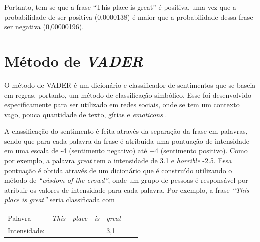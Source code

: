 Portanto, tem-se que a frase ``This place is great'' é positiva, uma vez que a
probabilidade de ser positiva (0,0000138) é maior que a probabilidade dessa
frase ser negativa (0,00000196).

\section{Método de \textit{VADER}}

O método de \ac{VADER} é um dicionário e classificador de sentimentos que se
baseia em regras, portanto, um método de classificação simbólico. Esse foi desenvolvido
especificamente para ser utilizado em redes sociais, onde se tem um contexto
vago, pouca quantidade de texto, gírias e \textit{emoticons}
\cite{conf/icwsm/HuttoG14}.

A classificação do sentimento é feita através da separação da frase em palavras,
sendo que para cada palavra da frase é atribuída uma pontuação de intensidade em
uma escala de -4 (sentimento negativo) até +4 (sentimento positivo). Como por
exemplo, a palavra \textit{great} tem a intensidade de 3.1 e \textit{horrible} -2.5. Essa pontuação é obtida através de
um dicionário que é construído utilizando o método de \textit{``wisdom of the
crowd''}, onde um grupo de pessoas é responsável por atribuir os valores de
intensidade para cada palavra. Por exemplo, a frase \textit{``This place is great''} seria classificada com


\begin{table}[htb]
\centering
\begin{tabular}{l|l|l|l|l|l|l}
Palavra         & \textit{This}        & \textit{place} & \textit{is}      &
\textit{great}
\\
Intensidade:   &  &   &  & 3,1
\end{tabular}
\label{my-label}
\end{table}

